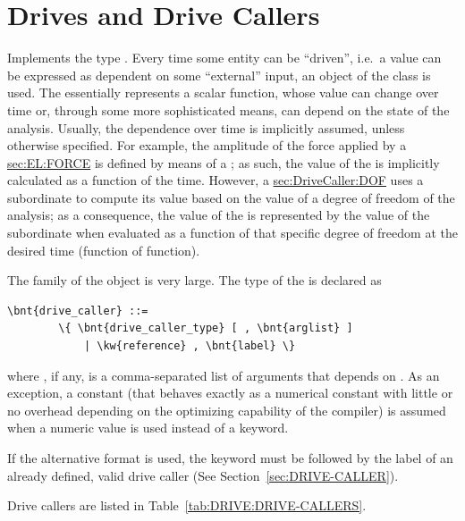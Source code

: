\section{Drives and Drive Callers}\label{sec:DriveCaller}
Implements the type .
Every time some entity can be ``driven'', i.e.\ a value can be
expressed as dependent on some ``external'' input, an object of the class 
 is used. 
The  essentially represents a scalar function, whose
value can change over time or, through some more sophisticated
means, can depend on the state of the analysis.
Usually, the dependence over time is implicitly assumed, unless
otherwise specified.
For example, the amplitude of the force applied by a 
\hyperref{\kw{force} element}{\kw{force} element (see Section~}{)}{sec:EL:FORCE}
is defined by means of a ; as such, the value of the  
is implicitly calculated as a function of the time.
However, a 
\hyperref{\kw{dof drive}}{\kw{dof drive} (see Section~}{)}{sec:DriveCaller:DOF}
uses a subordinate  to compute its value based on the value
of a degree of freedom of the analysis; as a consequence,
the value of the  is represented by the
value of the subordinate  when evaluated as a function
of that specific degree of freedom at the desired time (function of function).

The family of the  object is very large.
The type of the  is declared as
\begin{Verbatim}[commandchars=\\\{\}]
    \bnt{drive_caller} ::=
        \{ \bnt{drive_caller_type} [ , \bnt{arglist} ]
            | \kw{reference} , \bnt{label} \}
\end{Verbatim}    
where , if any, is a comma-separated list of arguments
that depends on .
As an exception, a constant  (that behaves exactly as a
numerical constant with little or no overhead depending on the optimizing
capability of the compiler) is assumed when a numeric value is used instead
of a keyword.

If the alternative format is used, the keyword  
must be followed by the label of an already defined, valid drive caller
(See Section~\ref{sec:DRIVE-CALLER}).

Drive callers are listed in Table~\ref{tab:DRIVE:DRIVE-CALLERS}.

